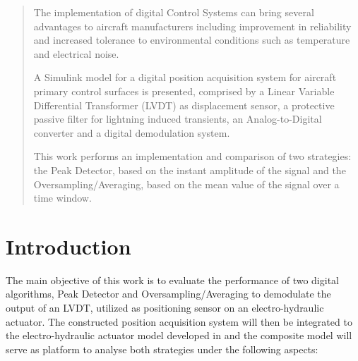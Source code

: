 \documentclass[conference]{IEEEtran}
\begin{document}




\maketitle

\begin{abstract}
The implementation of digital Control Systems can bring several advantages to aircraft manufacturers including improvement in reliability and increased tolerance to environmental conditions such as temperature and electrical noise. 

A Simulink model for a digital position acquisition system for aircraft primary control surfaces is presented, comprised by a Linear Variable Differential Transformer (LVDT) as displacement sensor, a protective passive filter for lightning induced transients, an Analog-to-Digital converter and a digital demodulation system. 

This work performs an implementation and comparison of two strategies: the Peak Detector, based on the instant amplitude of the signal and the Oversampling/Averaging, based on the mean value of the signal over a time window.

\end{abstract}


%
\IEEEpeerreviewmaketitle

\section{Introduction}


The main objective of this work is to evaluate the performance of two digital algorithms, Peak Detector and Oversampling/Averaging to demodulate the output of an LVDT, utilized as positioning sensor on an electro-hydraulic actuator. The constructed position acquisition system will then be integrated to the electro-hydraulic actuator model developed in \cite{Ballesteros} and the composite model will serve as platform to analyse both strategies under the following aspects:
\end{document}
